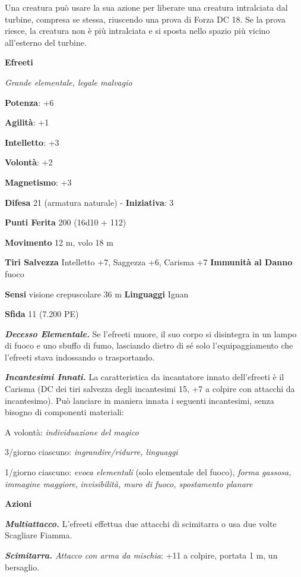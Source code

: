 \begin{multicols}{2}
Una creatura può usare la sua azione per liberare una creatura
intralciata dal turbine, compresa se stessa, riuscendo una prova di
Forza DC 18. Se la prova riesce, la creatura non è più intralciata e si
sposta nello spazio più vicino all'esterno del turbine.

\textbf{Efreeti}

\emph{Grande elementale, legale malvagio}

\textbf{Potenza}: +6

\textbf{Agilità}: +1

\textbf{Intelletto}: +3

\textbf{Volontà}: +2

\textbf{Magnetismo}: +3

\textbf{Difesa} 21 (armatura naturale) - \textbf{Iniziativa}: 3

\textbf{Punti Ferita} 200 (16d10 + 112) 

\textbf{Movimento} 12 m, volo 18 m

\textbf{Tiri Salvezza} Intelletto +7, Saggezza +6, Carisma +7
\textbf{Immunità al Danno} fuoco

\textbf{Sensi} visione crepuscolare 36 m
\textbf{Linguaggi} Ignan

\textbf{Sfida} 11 (7.200 PE)\smallskip

\emph{\textbf{Decesso Elementale.}} Se l'efreeti muore, il suo corpo si
disintegra in un lampo di fuoco e uno sbuffo di fumo, lasciando dietro
di sé solo l'equipaggiamento che l'efreeti stava indossando o
trasportando.

\emph{\textbf{Incantesimi Innati.}} La caratteristica da incantatore
innato dell'efreeti è il Carisma (DC dei tiri salvezza degli incantesimi
15, +7 a colpire con attacchi da incantesimo). Può lanciare in maniera
innata i seguenti incantesimi, senza bisogno di componenti materiali:

A volontà: \emph{individuazione del magico}

3/giorno ciascuno: \emph{ingrandire/ridurre, linguaggi}

1/giorno ciascuno: \emph{evoca elementali} (solo elementale del fuoco),
\emph{forma gassosa, immagine maggiore}, \emph{invisibilità, muro di
fuoco, spostamento planare}

\smallskip\textbf{Azioni}

\emph{\textbf{Multiattacco.}} L'efreeti effettua due attacchi di
scimitarra o usa due volte Scagliare Fiamma.

\emph{\textbf{Scimitarra.} Attacco con arma da mischia}: +11 a colpire,
portata 1 m, un bersaglio.


\end{multicols}
